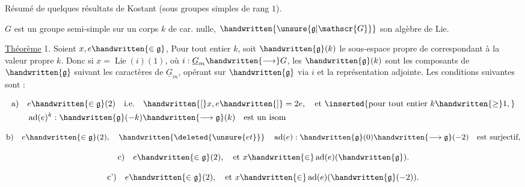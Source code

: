 Résumé de quelques résultats de Kostant (sous groupes simples de rang $1$).

$G$ est un groupe semi-simple sur un corps $k$ de car. nulle, $\handwritten{\unsure{\mathfrak{g}|\mathscr{G}}}$ son algèbre de Lie.

\uline{Théorème} 1.  Soient $x,e\handwritten{\in\mathfrak{g}}$, Pour tout entier $k$, soit $\handwritten{\mathfrak{g}}(k)$ le sous-espace propre de\hspace{1.5em} correspondant à la valeur propre $k$. Donc si $x=\operatorname{Lie}(i)(1)$, où $i:\underline{G}_m\handwritten{\longrightarrow}G$, les $\handwritten{\mathfrak{g}}(k)$ sont les  composants de $\handwritten{\mathfrak{g}}$ suivant les caractères de $\underline{G}_m$, opérant sur $\handwritten{\mathfrak{g}}$ via $i$ et la représentation adjointe. Les conditions suivantes sont :

\[
\begin{aligned}
\text{a)}\quad &e\handwritten{\in\mathfrak{g}}(2)\quad\text{i.e.}\quad \handwritten{[}x,e\handwritten{]}=2e,\quad\text{et }\inserted{\text{pour tout entier }k\handwritten{\geq}1,}\\
&\operatorname{ad}(e)^k:\handwritten{\mathfrak{g}}(-k)\handwritten{\longrightarrow\mathfrak{g}}(k)\quad\text{est un isom}
\end{aligned}
\]

\[
\text{b)}\quad e\handwritten{\in\mathfrak{g}}(2),\quad\handwritten{\deleted{\unsure{et}}}\quad \operatorname{ad}(e):\handwritten{\mathfrak{g}}(0)\handwritten{\longrightarrow\mathfrak{g}}(-2)\quad\text{est surjectif},
\]


\[
\text{c)}\quad e\handwritten{\in\mathfrak{g}}(2),\quad\text{et }x\handwritten{\in}\operatorname{ad}(e)(\handwritten{\mathfrak{g}}).
\]

\[
\text{c')}\quad e\handwritten{\in\mathfrak{g}}(2),\quad\text{et }x\handwritten{\in}\operatorname{ad}(e)(\handwritten{\mathfrak{g}}(-2)).
\]

